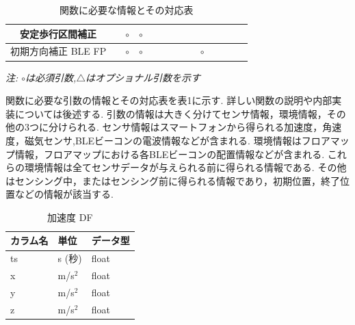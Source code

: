 \begin{table}[ht]
{\begin{tabular}{|c|c|c|c|c|c|c|c|c|c|c|c|c|c|}
			安定歩行区間補正      &                                                        & \multicolumn{1}{c|}{$\circ$} & \multicolumn{1}{c|}{$\circ$} &                              &                              &                              &                                                                                                               &                              &                              &                                  &    &                              &    \\ \hline
			初期方向補正 BLE FP &                                                        & \multicolumn{1}{c|}{$\circ$} & \multicolumn{1}{c|}{$\circ$} &                              &                              &                              &                                                                                                               &                              & \multicolumn{1}{c|}{$\circ$} &                                  &    &                              &    \\ \hline
		\end{tabular}
	}
	\caption{関数に必要な情報とその対応表} \label{}
	\textit{注: $\circ$は必須引数,$\triangle$はオプショナル引数を示す} \label{tab:my_label}
\end{table}


関数に必要な引数の情報とその対応表を表1に示す.
詳しい関数の説明や内部実装については後述する.
引数の情報は大きく分けてセンサ情報，環境情報，その他の3つに分けられる.
センサ情報はスマートフォンから得られる加速度，角速度，磁気センサ,BLEビーコンの電波情報などが含まれる.
環境情報はフロアマップ情報，フロアマップにおける各BLEビーコンの配置情報などが含まれる.
これらの環境情報は全てセンサデータが与えられる前に得られる情報である.
その他はセンシング中，またはセンシング前に得られる情報であり，初期位置，終了位置などの情報が該当する.


\begin{table}[h]
	\centering
	\begin{tabular}{lll}
		\toprule
		カラム名 & 単位        & データ型  \\
		\midrule
		ts   & s (秒)     & float \\
		x    & m/s\(^2\) & float \\
		y    & m/s\(^2\) & float \\
		z    & m/s\(^2\) & float \\
		\bottomrule
	\end{tabular}
	\caption{加速度 DF}
\end{table}


